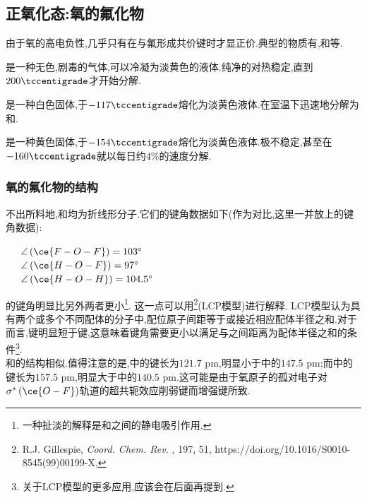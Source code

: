 \documentclass{ctexart}
\begin{document}
\subsection{正氧化态:氧的氟化物}
由于氧的高电负性,几乎只有在与氟形成共价键时才显正价.典型的物质有,和等.
\begin{substance}[\ce{OF2}]
    是一种无色,剧毒的气体,可以冷凝为淡黄色的液体.纯净的对热稳定,直到$200\tccentigrade$才开始分解.
\end{substance}
\begin{substance}[\ce{HOF}]
    是一种白色固体,于$-117\tccentigrade$熔化为淡黄色液体.在室温下迅速地分解为和.
\end{substance}
\begin{substance}[\ce{O2F2}]
    是一种黄色固体,于$-154\tccentigrade$熔化为淡黄色液体.极不稳定,甚至在$-160\tccentigrade$就以每日约$4\%$的速度分解.
\end{substance}
\subsubsection{氧的氟化物的结构} 不出所料地,和均为折线形分子.它们的键角数据如下(作为对比,这里一并放上的键角数据):
\begin{center}
    \ \ \ $\angle\left(\ce{F-O-F}\right)=103^\circ$\\
    \ \ \ $\angle\left(\ce{H-O-F}\right)=97^\circ$\\
    \ \ \ $\angle\left(\ce{H-O-H}\right)=104.5^\circ$
\end{center}

\indent {}的键角明显比另外两者更小\footnote{一种扯淡的解释是和之间的静电吸引作用.}.%
这一点可以用\footnote{R.J. Gillespie, \textit{Coord. Chem. Rev.} , 197, 51, https://doi.org/10.1016/S0010-8545(99)00199-X,}(LCP模型)进行解释.%
LCP模型认为具有两个或多个不同配体的分子中,配位原子间距等于或接近相应配体半径之和.对于而言,键明显短于键,这意味着键角需要更小以满足与之间距离为配体半径之和的条件\footnote{关于LCP模型的更多应用,应该会在后面再提到.}.\\
\indent {}和的结构相似.值得注意的是,中的键长为$121.7\text{ pm}$,明显小于中的$147.5\text{ pm}$;而中的键长为$157.5\text{ pm}$,明显大于中的$140.5\text{ pm}$.这可能是由于氧原子的孤对电子对$\sigma^\ast\left(\ce{O-F}\right)$轨道的超共轭效应削弱键而增强键所致.
\end{document}
